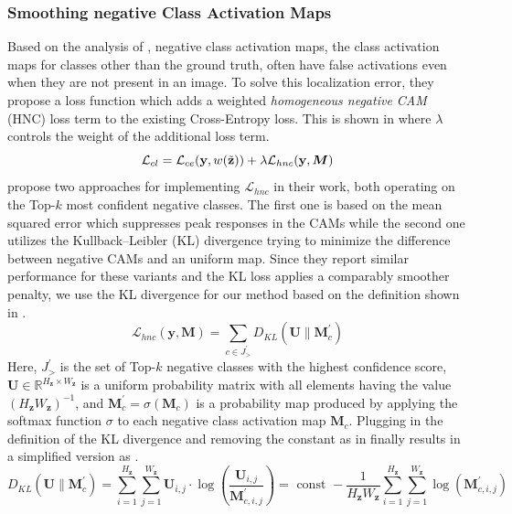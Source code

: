 \subsubsection{Smoothing negative Class Activation Maps}
Based on the analysis of \citet{sun2020fixing}, negative class activation maps, \ie the class activation maps for classes other than the ground truth, often have false activations even when they are not present in an image. To solve this localization error, they propose a loss function which adds a weighted \emph{homogeneous negative CAM} (HNC) loss term to the existing Cross-Entropy loss. This is shown in  where $\lambda$ controls the weight of the additional loss term. 
\begin{equation}
\label{eq:hnc}
\mathcal{L}_{c l} =\mathcal{L}_{ce}(\mathbf{y}, w(\Tilde{\mathbf{z}}))+\lambda \mathcal{L}_{hnc}(\mathbf{y}, \boldsymbol{M})
\end{equation}
\citet{sun2020fixing} propose two approaches for implementing $\mathcal{L}_{hnc}$ in their work, both operating on the Top-$k$ most confident negative classes. The first one is based on the mean squared error which suppresses peak responses in the CAMs while the second one utilizes the Kullback–Leibler (KL) divergence trying to minimize the difference between negative CAMs and an uniform map. Since they report similar performance for these variants and the KL loss applies a comparably smoother penalty, we use the KL divergence for our method based on the definition shown in .
\begin{equation}
\label{eq:hnc-kl}
\mathcal{L}_{hnc}(\mathbf{y}, \boldsymbol{M})=\sum_{c \in J^{\prime}_>} D_{K L}\left(\boldsymbol{U} \| \boldsymbol{M}_{c}^{\prime}\right)
\end{equation}
Here, $J^{\prime}_>$ is the set of Top-$k$ negative classes with the highest confidence score, $\boldsymbol{U} \in \mathbb{R}^{H_\mathbf{z} \times W_\mathbf{z}}$ is a uniform probability matrix with all elements having the value $(H_\mathbf{z}W_\mathbf{z})^{-1}$, and $\boldsymbol{M}_{c}^{\prime} = \sigma(\boldsymbol{M}_{c})$ is a probability map produced by applying the softmax function $\sigma$ to each negative class activation map $\boldsymbol{M}_{c}$. Plugging in the definition of the KL divergence and removing the constant as in  finally results in a simplified version as
.
\begin{equation}
\label{eq:kl-simplification}
D_{K L}\left(\boldsymbol{U} \| \boldsymbol{M}_{c}^{\prime}\right)=\sum_{i=1}^{H_\mathbf{z}} \sum_{j=1}^{W_\mathbf{z}} \boldsymbol{U}_{i,j} \cdot \log \left( \frac{\boldsymbol{U}_{i,j}}{\boldsymbol{M}_{c, i, j}^{\prime}} \right) =\text { const }-\frac{1}{H_\mathbf{z} W_\mathbf{z}} \sum_{i=1}^{H_\mathbf{z}} \sum_{j=1}^{W_\mathbf{z}} \log \left(\boldsymbol{M}_{c, i, j}^{\prime}\right)
\end{equation}
